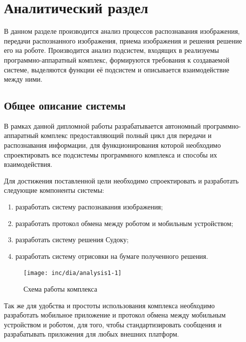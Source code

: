 \chapter{Аналитический раздел}
\label{cha:analysis}
%
%
В данном разделе производится анализ процессов распознавания изображения, передачи распознанного изображения, приема изображения и  решения решение его на роботе.
Производится анализ подсистем, входящих в реализуемы программно-аппаратный комплекс, формируются требования к создаваемой системе, выделяются функции её подсистем и описывается взаимодействие между ними.

\section{Общее описание системы}
В рамках данной дипломной работы разрабатывается автономный программно-аппаратный комплекс предоставляющий полный цикл для передачи и распознавания информации, для функционирования которой необходимо спроектировать все подсистемы программного комплекса и способы их взаимодействия.

Для достижения поставленной цели необходимо спроектировать и разработать следующие компоненты системы:
\begin{enumerate}
\item разработать систему распознавания изображения;
\item разработать протокол обмена между роботом и мобильным устройством;
\item разработать систему решения Судоку;
\item разработать систему отрисовки на бумаге полученного решения.
\end{enumerate}




\begin{figure}
  \centering
  \texttt{[image: inc/dia/analysis1-1]}
  \caption{Схема работы комплекса}
  \label{fig:fig01}
\end{figure}


Так же для удобства и простоты использования комплекса необходимо разработать мобильное приложение и протокол обмена между мобильным устройством и роботом, для того, чтобы стандартизировать сообщения и разрабатывать приложения для любых внешних платформ.

